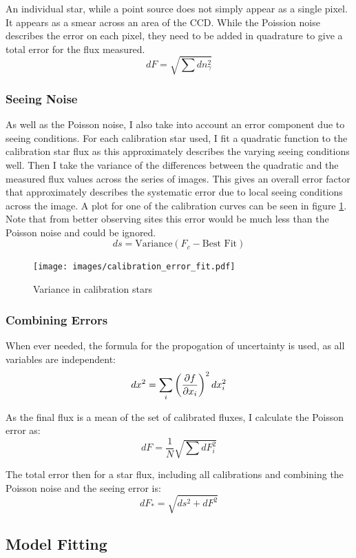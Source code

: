 An individual star, while a point source does not simply appear as a single pixel. It appears as a smear across an area of the CCD. While the Poission noise describes the error on each pixel, they need to be added in quadrature to give a total error for the flux measured.
\[ dF = \sqrt{\sum{dn_\gamma^2}} \]

\subsubsection{Seeing Noise}

As well as the Poisson noise, I also take into account an error component due to seeing conditions. For each calibration star used, I fit a quadratic function to the calibration star flux as this approximately describes the varying seeing conditions well. Then I take the variance of the differences between the quadratic and the measured flux values across the series of images. This gives an overall error factor that approximately describes the systematic error due to local seeing conditions across the image. A plot for one of the calibration curves can be seen in figure \ref{fig:calibration_error}. Note that from better observing sites this error would be much less than the Poisson noise and could be ignored.
\[ ds = \text{Variance}(F_c - \text{Best Fit})\]

\begin{figure}[ht]
    \centering
    \texttt{[image: images/calibration\_error\_fit.pdf]}
    \caption{Variance in calibration stars}
    \label{fig:calibration_error}
\end{figure}

\subsubsection{Combining Errors}

When ever needed, the formula for the propogation of uncertainty is used, as all variables are independent:
\[ dx^2 = \sum_i \left( \frac{\partial f}{\partial x_i}\right)^2 dx_i^2  \]

As the final flux is a mean of the set of calibrated fluxes, I calculate the Poisson error as:
\[ dF = \frac{1}{N}\sqrt{\sum{dF_i^2}} \]

The total error then for a star flux, including all calibrations and combining the Poisson noise and the seeing error is:
\[  dF_* = \sqrt{ds^2 + dF^2} \]

\subsection{Model Fitting}

